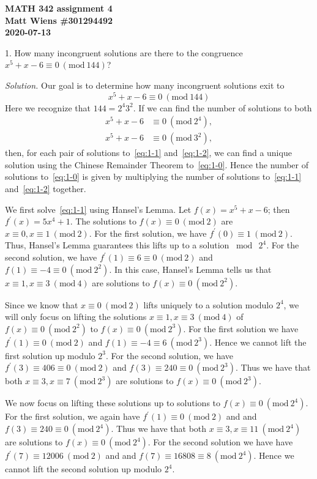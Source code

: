 \documentclass{article}
\newcommand{\Mod}[1]{\ (\mathrm{mod}\ #1)}
\begin{document}
\textbf{MATH 342 assignment 4} \\
\textbf{Matt Wiens \#301294492} \\
\textbf{2020-07-13}

1. How many incongruent solutions are there to the congruence
$x^5 + x - 6 \equiv 0 \Mod{144}$?

\textit{Solution.}
Our goal is to determine how many incongruent solutions exit to
%
\begin{equation}
    x^5 + x - 6 \equiv 0 \Mod{144}
    \label{eq:1-0}
\end{equation}
%
Here we recognize that $144 = 2^4 3^2$. If we can find
the number of solutions to both
%
\begin{align}
    x^5 + x - 6 &\equiv 0 \Mod{2^4},
    \label{eq:1-1}
    \\
    x^5 + x - 6 &\equiv 0 \Mod{3^2},
    \label{eq:1-2}
\end{align}
%
then, for each pair of solutions to~\eqref{eq:1-1} and~\eqref{eq:1-2},
we can find a unique solution using the Chinese Remainder Theorem
to~\eqref{eq:1-0}. Hence the number of solutions to~\eqref{eq:1-0} is
given by multiplying the number of solutions to~\eqref{eq:1-1}
and~\eqref{eq:1-2} together.

We first solve~\eqref{eq:1-1} using Hansel's Lemma.
Let $f(x) = x^5 + x - 6$; then $f^\prime(x) = 5 x^4 + 1$. The solutions
to $f(x) \equiv 0 \Mod{2}$ are $x \equiv 0, x \equiv 1 \Mod{2}$.
For the first solution, we have $f^\prime(0) \equiv 1 \Mod 2$.
Thus, Hansel's Lemma guarantees this lifts up to a solution $\bmod \ 2^4$.
For the second solution, we have $f^\prime(1) \equiv 6 \equiv 0 \Mod 2$
and $f(1) \equiv -4 \equiv 0 \Mod{2^2}$. In this case, Hansel's Lemma
tells us that $x \equiv 1, x \equiv 3 \Mod 4$ are solutions to
$f(x) \equiv 0 \Mod{2^2}$.

Since we know that $x \equiv 0 \Mod 2$ lifts uniquely to a solution
modulo $2^4$, we will only focus on lifting the solutions
$x \equiv 1, x \equiv 3 \Mod 4$
of $f(x) \equiv 0 \Mod{2^2}$ to $f(x) \equiv 0 \Mod{2^3}$.
For the first solution we have $f^\prime(1) \equiv 0 \Mod 2$
and $f(1) \equiv -4 \equiv 6 \Mod{2^3}$. Hence we cannot lift the
first solution up modulo $2^3$. For the second solution,
we have $f^\prime(3) \equiv 406 \equiv 0 \Mod 2$
and $f(3) \equiv 240 \equiv 0 \Mod{2^3}$. Thus we have that
both $x \equiv 3, x \equiv 7 \Mod{2^3}$ are solutions to
$f(x) \equiv 0 \Mod{2^3}$.

We now focus on lifting these solutions up to solutions to
$f(x) \equiv 0 \Mod{2^4}$. For the first solution,
we again have $f^\prime(1) \equiv 0 \Mod 2$ and
and $f(3) \equiv 240 \equiv 0 \Mod{2^4}$. Thus we have that
both $x \equiv 3, x \equiv 11 \Mod{2^4}$ are solutions to
$f(x) \equiv 0 \Mod{2^4}$. For the second solution
we have have $f^\prime(7) \equiv 12006 \Mod 2$ and
and $f(7) \equiv 16808 \equiv 8 \Mod{2^4}$. Hence we cannot
lift the second solution up modulo $2^4$.
\end{document}
